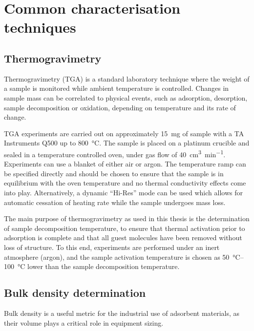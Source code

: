 
\graphicspath{ {\thisappx/figures/} }

\chapter{Common characterisation techniques}\label{appx:char}

\section{Thermogravimetry}\label{appx:char:TGA}

Thermogravimetry (TGA) is a standard laboratory technique where the
weight of a sample is monitored while ambient temperature is controlled.
Changes in sample mass can be correlated to physical events, such
as adsorption, desorption, sample decomposition or oxidation, depending
on temperature and its rate of change.

TGA experiments are carried out on approximately \SI{15}{\milli\gram} of 
sample with a TA Instruments Q500 up to \SI{800}{\degreeCelsius}.
The sample is placed on a platinum crucible and sealed in a temperature
controlled oven, under gas flow of \SI{40}{\cm\cubed\per\minute}.
Experiments can use a blanket of either air or argon. The temperature
ramp can be specified directly and should be chosen to ensure 
that the sample is in equilibrium with the oven temperature and no
thermal conductivity effects come into play. Alternatively,
a dynamic “Hi-Res” mode can be used which allows for automatic
cessation of heating rate while the sample undergoes mass loss.

The main purpose of thermogravimetry as used in this thesis is the
determination of sample decomposition temperature, to ensure
that thermal activation prior to adsorption is complete and 
that all guest molecules have been removed without loss of
structure. To this end, experiments are performed under an inert
atmosphere (argon), and the sample activation temperature is chosen
as \SIrange{50}{100}{\degreeCelsius} lower than the sample 
decomposition temperature.

\section{Bulk density determination}\label{appx:char:bulkdensity}

Bulk density is a useful metric for the industrial use of adsorbent
materials, as their volume plays a critical role in equipment sizing.

